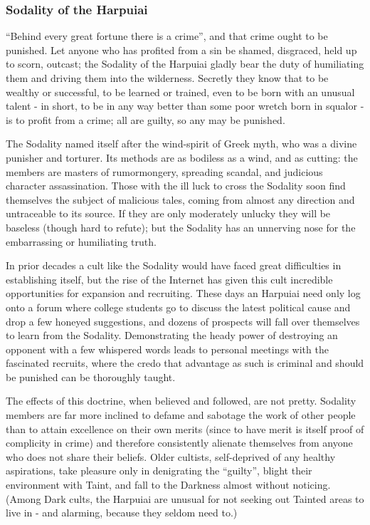 \subsubsection*{Sodality of the Harpuiai}
\textquotedblleft Behind every great fortune there is a crime\textquotedblright, and that crime ought to be punished. Let anyone who has profited from a sin be shamed, disgraced, held up to scorn, outcast; the Sodality of the Harpuiai gladly bear the duty of humiliating them and driving them into the wilderness. Secretly they know that to be wealthy or successful, to be learned or trained, even to be born with an unusual talent - in short, to be in any way better than some poor wretch born in squalor - is to profit from a crime; all are guilty, so any may be punished.

The Sodality named itself after the wind-spirit of Greek myth, who was a divine punisher and torturer. Its methods are as bodiless as a wind, and as cutting: the members are masters of rumormongery, spreading scandal, and judicious character assassination. Those with the ill luck to cross the Sodality soon find themselves the subject of malicious tales, coming from almost any direction and untraceable to its source. If they are only moderately unlucky they will be baseless (though hard to refute); but the Sodality has an unnerving nose for the embarrassing or humiliating truth.

In prior decades a cult like the Sodality would have faced great difficulties in establishing itself, but the rise of the Internet has given this cult incredible opportunities for expansion and recruiting. These days an Harpuiai need only log onto a forum where college students go to discuss the latest political cause and drop a few honeyed suggestions, and dozens of prospects will fall over themselves to learn from the Sodality. Demonstrating the heady power of destroying an opponent with a few whispered words leads to personal meetings with the fascinated recruits, where the credo that advantage as such is criminal and should be punished can be thoroughly taught.

The effects of this doctrine, when believed and followed, are not pretty. Sodality members are far more inclined to defame and sabotage the work of other people than to attain excellence on their own merits (since to have merit is itself proof of complicity in crime) and therefore consistently alienate themselves from anyone who does not share their beliefs. Older cultists, self-deprived of any healthy aspirations, take pleasure only in denigrating the \textquotedblleft guilty\textquotedblright, blight their environment with Taint, and fall to the Darkness almost without noticing. (Among Dark cults, the Harpuiai are unusual for not seeking out Tainted areas to live in - and alarming, because they seldom need to.)

